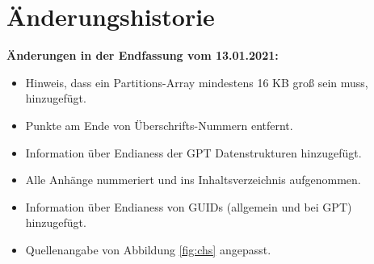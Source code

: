 \section{Änderungshistorie}

\textbf{Änderungen in der Endfassung vom 13.01.2021:}

\begin{itemize}
    \item Hinweis, dass ein Partitions-Array mindestens 16 KB groß sein muss, hinzugefügt.

    \item Punkte am Ende von Überschrifts-Nummern entfernt.

    \item Information über Endianess der GPT Datenstrukturen hinzugefügt.
    
    \item Alle Anhänge nummeriert und ins Inhaltsverzeichnis aufgenommen.
    
    \item Information über Endianess von GUIDs (allgemein und bei GPT) hinzugefügt.
    
    \item Quellenangabe von Abbildung \ref{fig:chs} angepasst.
\end{itemize}
